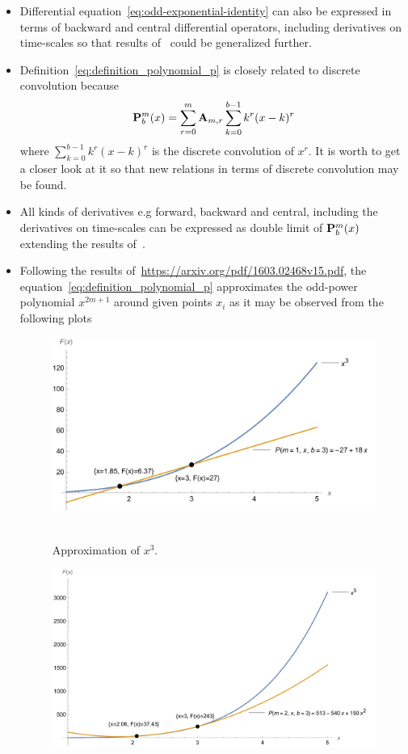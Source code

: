 \begin{itemize}
    \item Differential equation~\eqref{eq:odd-exponential-identity} can also be expressed in terms of backward
    and central differential operators, including derivatives on time-scales so that results of~\cite{kolosov2016study}
    could be generalized further.
    \item Definition~\eqref{eq:definition_polynomial_p} is closely related to discrete convolution because
    \begin{equation*}
        {\mathbf{P}}\sp{m} \sb{b}(x) = \sum_{r=0}^{m} {\mathbf{A}} \sb{m,r} \sum_{k=0}^{b-1} k^r(x-k)^r
    \end{equation*}
    where $\sum_{k=0}^{b-1} k^r(x-k)^r$ is the discrete convolution of $x^r$.
    It is worth to get a closer look at it so that new relations in terms of discrete convolution may be found.
    \item All kinds of derivatives e.g forward, backward and central, including the derivatives on time-scales can be expressed
    as double limit of ${\mathbf{P}}\sp{m} \sb{b}(x)$ extending the results of~\cite{kolosov_2024_10575485}.
    \item Following the results of~\url{https://arxiv.org/pdf/1603.02468v15.pdf},
    the equation~\eqref{eq:definition_polynomial_p} approximates the odd-power polynomial $x^{2m+1}$ around given points
    $x_i$ as it may be observed from the following plots
    \begin{figure}[H]
        \centering
        \includegraphics[width=1\textwidth]{images/n^3_approximation_m1_b3}
        ~\caption{Approximation of $x^3$.}\label{fig:approximation-n3}
    \end{figure}
    \begin{figure}[H]
        \centering
        \includegraphics[width=1\textwidth]{images/n^5_approximation_m2_b3}

\end{figure}
\end{itemize}
